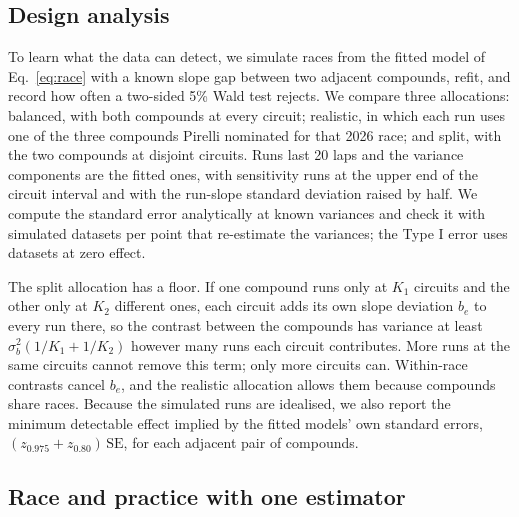 \subsection{Design analysis}\label{sec:design}

To learn what the data can detect, we simulate races from the fitted model of Eq.~\eqref{eq:race} with a known slope gap between two adjacent compounds, refit, and record how often a two-sided 5\% Wald test rejects.
We compare three allocations: balanced, with both compounds at every circuit; realistic, in which each run uses one of the three compounds Pirelli nominated for that 2026 race; and split, with the two compounds at disjoint circuits.
Runs last 20 laps and the variance components are the fitted ones, with sensitivity runs at the upper end of the circuit interval and with the run-slope standard deviation raised by half.
We compute the standard error analytically at known variances and check it with \PXSimReps{} simulated datasets per point that re-estimate the variances; the Type I error uses \PXSizeReps{} datasets at zero effect.

The split allocation has a floor.
If one compound runs only at $K_1$ circuits and the other only at $K_2$ different ones, each circuit adds its own slope deviation $b_e$ to every run there, so the contrast between the compounds has variance at least $\sigma_b^2(1/K_1+1/K_2)$ however many runs each circuit contributes.
More runs at the same circuits cannot remove this term; only more circuits can.
Within-race contrasts cancel $b_e$, and the realistic allocation allows them because compounds share races.
Because the simulated runs are idealised, we also report the minimum detectable effect implied by the fitted models' own standard errors, $(z_{0.975}+z_{0.80})\,\mathrm{SE}$, for each adjacent pair of compounds.

\subsection{Race and practice with one estimator}\label{sec:mgmt}

